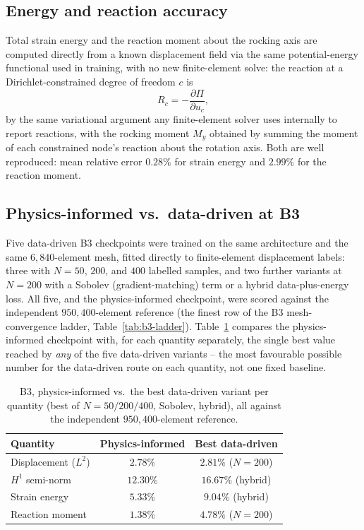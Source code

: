\documentclass[final,5p,times]{elsarticle}
\begin{document}
\subsection{Energy and reaction accuracy}
Total strain energy and the reaction moment about the rocking axis are
computed directly from a known displacement field via the same potential-energy
functional used in training, with no new finite-element solve: the
reaction at a Dirichlet-constrained degree of freedom $c$ is
\begin{equation}
  R_c = -\frac{\partial \Pi}{\partial u_c},
  \label{eq:reaction}
\end{equation}
by the same variational argument any finite-element solver uses
internally to report reactions, with the rocking moment $M_y$ obtained by
summing the moment of each constrained node's reaction about the
rotation axis. Both are well reproduced: mean relative error $0.28\%$ for
strain energy and $2.99\%$ for the reaction moment.

\subsection{Physics-informed vs.\ data-driven at B3}
\label{sec:b3-pi-vs-dd}
Five data-driven B3 checkpoints were trained on the same architecture and
the same $6{,}840$-element mesh, fitted directly to finite-element
displacement labels: three with $N{=}50$, $200$, and $400$ labelled
samples, and two further variants at $N{=}200$ with a Sobolev
(gradient-matching) term or a hybrid data-plus-energy loss. All five, and
the physics-informed checkpoint, were scored against the independent
$950{,}400$-element reference (the finest row of the B3 mesh-convergence
ladder, Table~\ref{tab:b3-ladder}). Table~\ref{tab:b3-pi-vs-dd} compares
the physics-informed checkpoint with, for each quantity separately, the
single best value reached by \emph{any} of the five data-driven variants
-- the most favourable possible number for the data-driven route on each
quantity, not one fixed baseline.

\begin{table}[h]
\centering
\caption{B3, physics-informed vs.\ the best data-driven variant per
  quantity (best of $N{=}50/200/400$, Sobolev, hybrid), all against the
  independent $950{,}400$-element reference.}
\label{tab:b3-pi-vs-dd}
\small
\begin{tabular}{lcc}
\toprule
Quantity & Physics-informed & Best data-driven \\
\midrule
Displacement ($L^2$)  & $2.78\%$  & $2.81\%$ ($N{=}200$) \\
$H^1$ semi-norm       & $12.30\%$ & $16.67\%$ (hybrid) \\
Strain energy         & $5.33\%$  & $9.04\%$ (hybrid) \\
Reaction moment       & $1.38\%$  & $4.78\%$ ($N{=}200$) \\
\bottomrule
\end{tabular}
\end{table}
\end{document}

